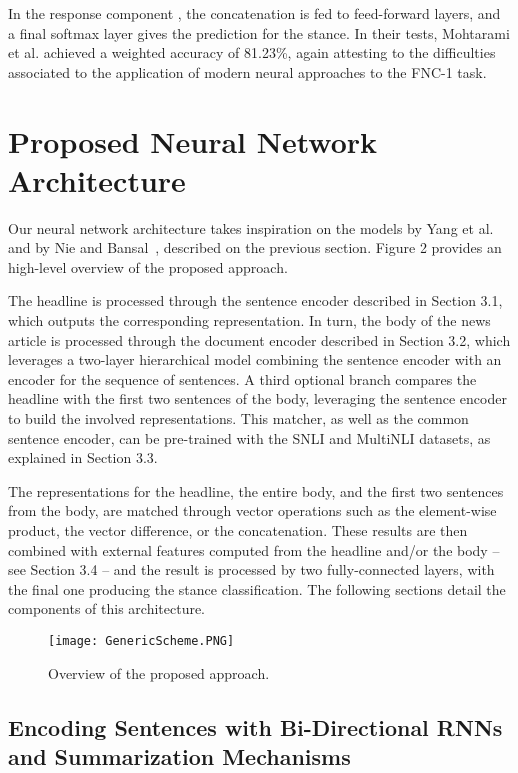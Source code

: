 In the response component , the concatenation  is fed to feed-forward layers, and a final softmax layer gives the prediction for the stance. In their tests, Mohtarami et al. achieved a weighted accuracy of 81.23\%, again attesting to the difficulties associated to the application of modern neural approaches to the FNC-1 task.

\section{Proposed Neural Network Architecture}

Our neural network architecture takes inspiration on the models by Yang et al.~\cite{hierarchical} and by Nie and Bansal~\cite{shortcut}, described on the previous section. Figure 2 provides an high-level overview of the proposed approach. 

The headline is processed through the sentence encoder described in Section 3.1, which outputs the corresponding representation. In turn, the body of the news article is processed through the document encoder described in Section 3.2, which leverages a two-layer hierarchical model combining the sentence encoder with an encoder for the sequence of sentences. A third optional branch compares the headline with the first two sentences of the body, leveraging the sentence encoder to build the involved representations. This matcher, as well as the common sentence encoder, can be pre-trained with the SNLI and MultiNLI datasets, as explained in Section 3.3.

The representations for the headline, the entire body, and the first two sentences from the body, are matched through vector operations such as the element-wise product, the vector difference, or the concatenation. These results are then combined with external features computed from the headline and/or the body -- see Section 3.4 -- and the result is processed by two fully-connected layers, with the final one producing the stance classification. The following sections detail the components of this architecture.

\begin{figure}[t]
  \begin{center}
  \texttt{[image: GenericScheme.PNG]}
  \caption{Overview of the proposed approach.}
  \label{fig:baseline}
  \end{center}
\end{figure}

\subsection{Encoding Sentences with Bi-Directional RNNs and Summarization Mechanisms}

